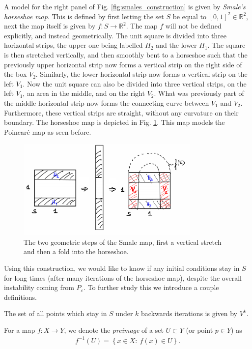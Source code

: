A model for the right panel of Fig. \ref{fig:smales_construction} is given by \emph{Smale's horseshoe map}. This is defined by first letting the set $S$ be equal to $[0,1]^2\in \mathbb{R}^{2}$, next the map itself is given by $f:S\to\mathbb{R}^{2}$. The map $f$ will not be defined explicitly, and instead geometrically. The unit square is divided into three horizontal strips, the upper one being labelled $H_2$ and the lower $H_1$. The square is then stretched vertically, and then smoothly bent to a horseshoe such that the previously upper horizontal strip now forms a vertical strip on the right side of the box $V_2$. Similarly, the lower horizontal strip now forms a vertical strip on the left $V_1$. Now the unit square can also be divided into three vertical strips, on the left $V_1$, an area in the middle, and on the right $V_2$. What was previously part of the middle horizontal strip now forms the connecting curve between $V_1$ and $V_2$. Furthermore, these vertical strips are straight, without any curvature on their boundary. The horseshoe map is depicted in Fig. \ref{fig:smale_map}. This map models the Poincaré map as seen before.
\begin{figure}[h!]
	\centering
	\includegraphics[width=0.8\textwidth]{figures/ch6/17smale_map.png}
	\caption{The two geometric steps of the Smale map, first a vertical stretch and then a fold into the horseshoe.}
	\label{fig:smale_map}
\end{figure}

Using this construction, we would like to know if any initial conditions stay in $S$ for long times (after many iterations of the horseshoe map), despite the overall instability coming from $P_{\varepsilon}$. To further study this we introduce a couple definitions.
\begin{definition}
	The set of all points which stay in $S$ under $k$ backwards iterations is given by $V^{k}$.
\end{definition}
\begin{definition}[]
	For a map $f:X \to Y$, we denote the \emph{preimage} of a set $U\subset Y$ (or point $p\in Y$) as
	\begin{align}
		\boxed{
			f^{-1}(U) = \left\{ x\in X:\ f(x) \in U\right\}.
		}
	\end{align}
\end{definition}

